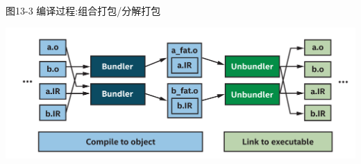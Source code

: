 \hspace*{\fill} \par %
图13-3 编译过程:组合打包/分解打包
\begin{center}
	\includegraphics[width=1.\textwidth]{content/chapter-13/images/4}
\end{center}




































